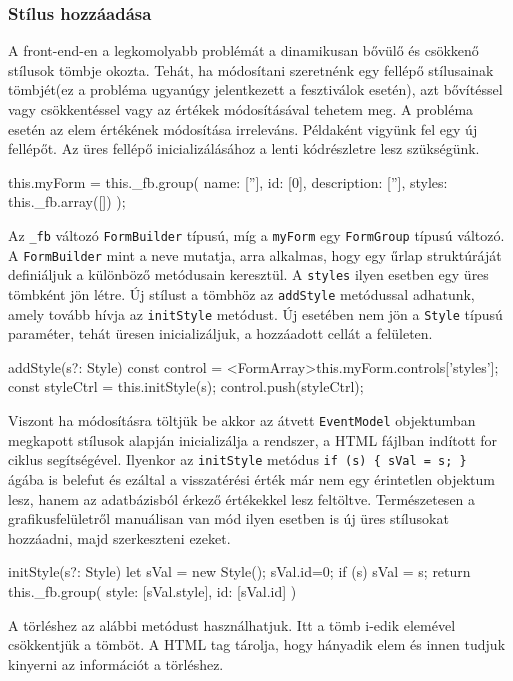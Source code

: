 \subsubsection{Stílus hozzáadása}
A front-end-en a legkomolyabb problémát a dinamikusan bővülő és csökkenő stílusok tömbje okozta. Tehát, ha módosítani szeretnénk egy fellépő stílusainak tömbjét(ez a probléma ugyanúgy jelentkezett a fesztiválok esetén), azt bővítéssel vagy csökkentéssel vagy az értékek módosításával tehetem meg. A probléma esetén az elem értékének módosítása irreleváns. Példaként vigyünk fel egy új fellépőt. Az üres fellépő inicializálásához a lenti kódrészletre lesz szükségünk.
\begin{java}
 this.myForm = this._fb.group({
        name: [''],
        id: [0],
        description: [''],
        styles: this._fb.array([])
      });
\end{java}
Az \texttt{\_fb} változó \texttt{FormBuilder} típusú, míg a \texttt{myForm} egy \texttt{FormGroup} típusú változó. A \texttt{FormBuilder} mint a neve mutatja, arra alkalmas, hogy egy űrlap struktúráját definiáljuk a különböző metódusain keresztül. A \texttt{styles} ilyen esetben egy üres tömbként jön létre. Új stílust a tömbhöz az \texttt{addStyle} metódussal adhatunk, amely tovább hívja az \texttt{initStyle} metódust. Új esetében nem jön a \texttt{Style} típusú paraméter, tehát üresen inicializáljuk, a hozzáadott cellát a felületen.
\begin{java}
addStyle(s?: Style) {
    const control = <FormArray>this.myForm.controls['styles'];
    const styleCtrl = this.initStyle(s);
    control.push(styleCtrl);
}
\end{java}
Viszont ha módosításra töltjük be akkor az átvett \texttt{EventModel} objektumban megkapott stílusok alapján inicializálja a rendszer, a HTML fájlban indított for ciklus segítségével. Ilyenkor az \texttt{initStyle} metódus \texttt{if (s) \{ sVal = s; \} } ágába is belefut és ezáltal a visszatérési érték már nem egy érintetlen objektum lesz, hanem az adatbázisból érkező értékekkel lesz feltöltve. Természetesen a grafikusfelületről manuálisan van mód ilyen esetben is új üres stílusokat hozzáadni, majd szerkeszteni ezeket. 
\begin{java}
  initStyle(s?: Style) {
    let sVal = new Style();
    sVal.id=0;
    if (s) { sVal = s; }
    return this._fb.group({
      style: [sVal.style],
      id: [sVal.id]
    })
  }
\end{java}
A törléshez az alábbi metódust használhatjuk. Itt a tömb i-edik elemével csökkentjük a tömböt. A HTML tag tárolja, hogy hányadik elem és innen tudjuk kinyerni az információt a törléshez.
